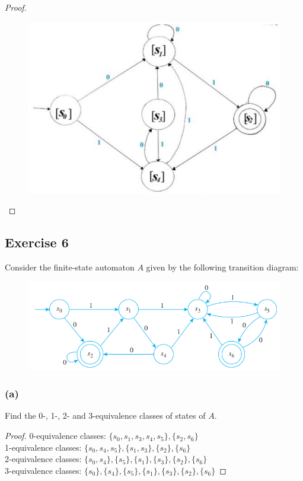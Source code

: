 \documentclass[14pt]{extarticle}
\begin{document}
\begin{proof}
\begin{figure}[ht!]
\centering
\includegraphics[scale=0.3]{../images/12.3.5.b.png}
\end{figure}
\end{proof}

\subsection{Exercise 6}
Consider the finite-state automaton \(A\) given by the following transition diagram:

\begin{figure}[ht!]
\centering
\includegraphics[scale=0.5]{../images/12.3.6.png}
\end{figure}

\subsubsection{(a)}
Find the 0-, 1-, 2- and 3-equivalence classes of states of \(A\).

\begin{proof}
0-equivalence classes: \(\{s_0, s_1, s_3, s_4, s_5\}, \{s_2, s_6\}\) \\
1-equivalence classes: \(\{s_0, s_4, s_5\}, \{s_1, s_3\}, \{s_2\}, \{s_6\}\) \\
2-equivalence classes: \(\{s_0, s_4\}, \{s_5\}, \{s_1\}, \{s_3\}, \{s_2\}, \{s_6\}\) \\
3-equivalence classes: \(\{s_0\}, \{s_4\}, \{s_5\}, \{s_1\}, \{s_3\}, \{s_2\}, \{s_6\}\)
\end{proof}
\end{document}
